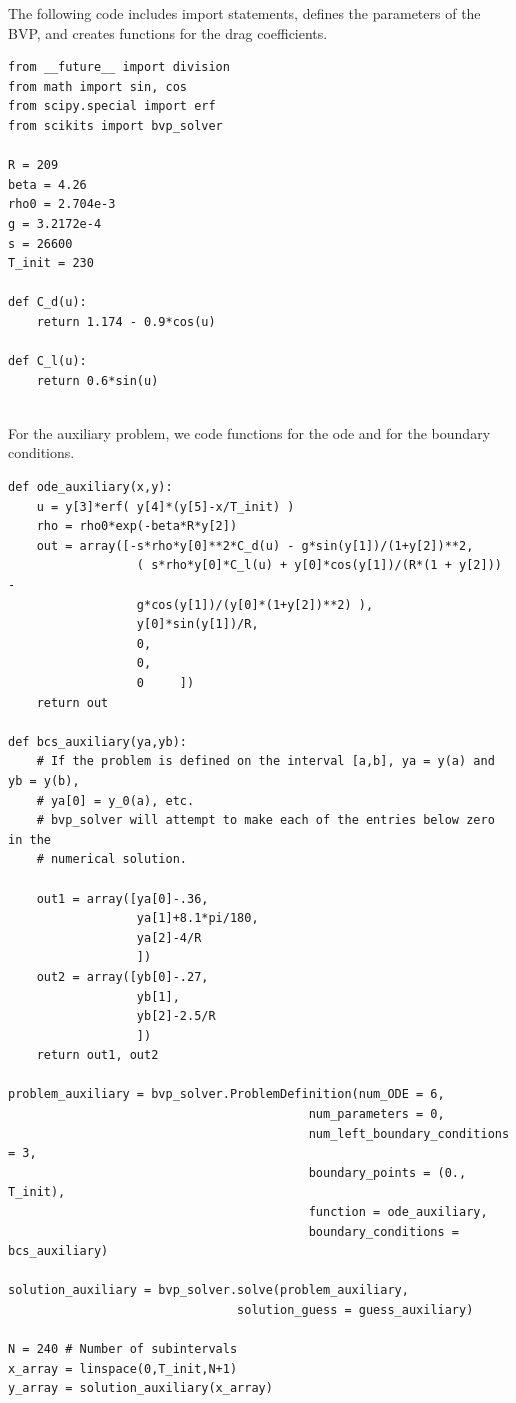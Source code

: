 The following code includes import statements, defines the parameters of the BVP, and creates functions for the drag coefficients. 
\begin{lstlisting}
from __future__ import division
from math import sin, cos
from scipy.special import erf
from scikits import bvp_solver 

R = 209
beta = 4.26
rho0 = 2.704e-3
g = 3.2172e-4
s = 26600	
T_init = 230

def C_d(u): 
	return 1.174 - 0.9*cos(u)

def C_l(u): 
	return 0.6*sin(u)
	
\end{lstlisting}

For the auxiliary problem, we code functions for the ode and for the boundary conditions. 
\begin{lstlisting}
def ode_auxiliary(x,y):
	u = y[3]*erf( y[4]*(y[5]-x/T_init) )
	rho = rho0*exp(-beta*R*y[2])
	out = array([-s*rho*y[0]**2*C_d(u) - g*sin(y[1])/(1+y[2])**2,
				  ( s*rho*y[0]*C_l(u) + y[0]*cos(y[1])/(R*(1 + y[2])) - 
				  g*cos(y[1])/(y[0]*(1+y[2])**2) ),
				  y[0]*sin(y[1])/R,
				  0,
				  0,
				  0		])
	return out
	
def bcs_auxiliary(ya,yb):
	# If the problem is defined on the interval [a,b], ya = y(a) and yb = y(b), 
	# ya[0] = y_0(a), etc.
	# bvp_solver will attempt to make each of the entries below zero in the 
	# numerical solution.
	
	out1 = array([ya[0]-.36,
				  ya[1]+8.1*pi/180,
				  ya[2]-4/R
				  ])
	out2 = array([yb[0]-.27,
				  yb[1],
				  yb[2]-2.5/R
				  ])
	return out1, out2

problem_auxiliary = bvp_solver.ProblemDefinition(num_ODE = 6,
										  num_parameters = 0,
										  num_left_boundary_conditions = 3,
										  boundary_points = (0., T_init),
										  function = ode_auxiliary,
										  boundary_conditions = bcs_auxiliary)
									
solution_auxiliary = bvp_solver.solve(problem_auxiliary,
								solution_guess = guess_auxiliary)
								
N = 240 # Number of subintervals
x_array = linspace(0,T_init,N+1)
y_array = solution_auxiliary(x_array)
	
\end{lstlisting}

